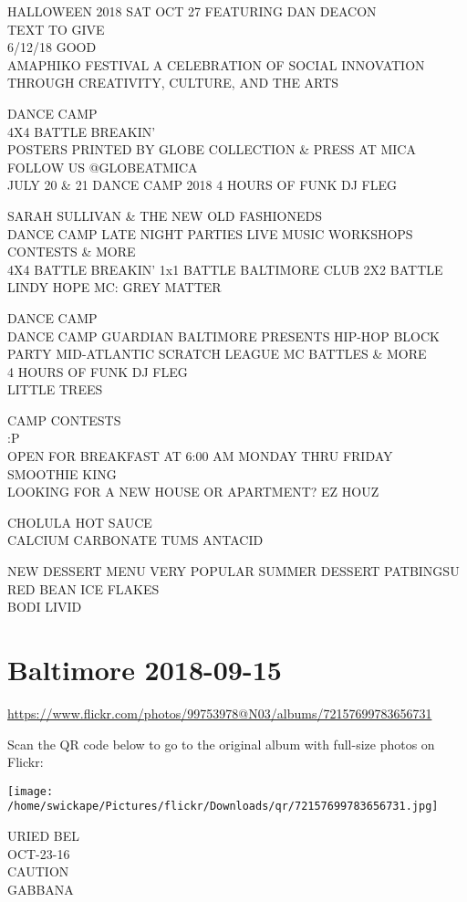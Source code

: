 \documentclass[10pt,letterpaper]{article}
\begin{document}
HALLOWEEN 2018 SAT OCT 27 FEATURING DAN DEACON\\
TEXT TO GIVE\\
6/12/18 GOOD\\
AMAPHIKO FESTIVAL A CELEBRATION OF SOCIAL INNOVATION THROUGH CREATIVITY, CULTURE, AND THE ARTS

DANCE CAMP\\
4X4 BATTLE BREAKIN'\\
POSTERS PRINTED BY GLOBE COLLECTION \& PRESS AT MICA FOLLOW US @GLOBEATMICA\\
JULY 20 \& 21 DANCE CAMP 2018 4 HOURS OF FUNK DJ FLEG

SARAH SULLIVAN \& THE NEW OLD FASHIONEDS\\
DANCE CAMP LATE NIGHT PARTIES LIVE MUSIC WORKSHOPS CONTESTS \& MORE\\
4X4 BATTLE BREAKIN' 1x1 BATTLE BALTIMORE CLUB 2X2 BATTLE LINDY HOPE MC: GREY MATTER

DANCE CAMP\\
DANCE CAMP GUARDIAN BALTIMORE PRESENTS HIP{-}HOP BLOCK PARTY MID{-}ATLANTIC SCRATCH LEAGUE MC BATTLES \& MORE\\
4 HOURS OF FUNK DJ FLEG\\
LITTLE TREES

CAMP CONTESTS\\
:P\\
OPEN FOR BREAKFAST AT 6:00 AM MONDAY THRU FRIDAY SMOOTHIE KING\\
LOOKING FOR A NEW HOUSE OR APARTMENT?  EZ HOUZ

CHOLULA HOT SAUCE\\
CALCIUM CARBONATE TUMS ANTACID

NEW DESSERT MENU VERY POPULAR SUMMER DESSERT PATBINGSU RED BEAN ICE FLAKES\\
BODI LIVID


\section*{Baltimore 2018-09-15}

\url{https://www.flickr.com/photos/99753978@N03/albums/72157699783656731}

Scan the QR code below to go to the original album with full-size photos on Flickr:

\texttt{[image: /home/swickape/Pictures/flickr/Downloads/qr/72157699783656731.jpg]}


URIED BEL\\
OCT{-}23{-}16\\
CAUTION\\
GABBANA
\end{document}
